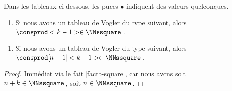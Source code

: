 

\begin{fact} \label{vogler-sub-square}
	Dans les tableaux ci-dessous, les puces $\bullet$ indiquent des valeurs quelconques.
	
	\begin{enumerate}
		\item Si nous avons un tableau de Vogler du type suivant, alors $\consprod<k-1> \in \NNssquare$\,.
	\end{enumerate}

	\begin{center}
	\end{center}


	\begin{enumerate}[start=2]
		\item Si nous avons un tableau de Vogler du type suivant, alors $\consprod[n+1]<k-1> \in \NNssquare$\,.
	\end{enumerate}

	\begin{center}
	\end{center}
\end{fact}


\begin{proof}
	Immédiat via le fait \ref{facto-square}, car nous avons soit $n + k \in \NNssquare$\,, soit $n \in \NNssquare$\,.
\end{proof}




